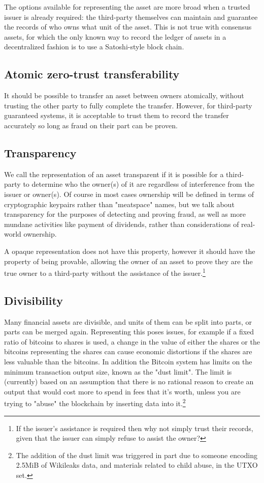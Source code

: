 \documentclass{article}
\begin{document}
The options available for representing the asset are more broad when a trusted
issuer is already required: the third-party themselves can maintain and
guarantee the records of who owns what unit of the asset. This is not true with
consensus assets, for which the only known way to record the ledger of assets
in a decentralized fashion is to use a Satoshi-style block chain.


\subsection{Atomic zero-trust transferability}

It should be possible to transfer an asset between owners atomically, without
trusting the other party to fully complete the transfer. However, for
third-party guaranteed systems, it is acceptable to trust them to record the
transfer accurately so long as fraud on their part can be proven.


\subsection{Transparency}

We call the representation of an asset transparent if it is possible for a
third-party to determine who the owner(s) of it are regardless of interference
from the issuer or owner(s). Of course in most cases ownership will be defined
in terms of cryptographic keypairs rather than "meatspace" names, but we talk
about transparency for the purposes of detecting and proving fraud, as well as
more mundane activities like payment of dividends, rather than considerations
of real-world ownership.

A opaque representation does not have this property, however it should have the
property of being provable, allowing the owner of an asset to prove they are
the true owner to a third-party without the assistance of the
issuer.\footnote{If the issuer's assistance is required then why not simply
trust their records, given that the issuer can simply refuse to assist the
owner?}


\subsection{Divisibility}

Many financial assets are divisible, and units of them can be split into parts,
or parts can be merged again. Representing this poses issues, for example if a
fixed ratio of bitcoins to shares is used, a change in the value of either the
shares or the bitcoins representing the shares can cause economic distortions
if the shares are less valuable than the bitcoins. In addition the Bitcoin
system has limits on the minimum transaction output size, known as the "dust
limit". The limit is (currently) based on an assumption that there is no
rational reason to create an output that would cost more to spend in fees that
it's worth, unless you are trying to "abuse" the blockchain by inserting data
into it.\footnote{The addition of the dust limit was triggered in part due to
someone encoding 2.5MiB of Wikileaks data, and materials related to child
abuse, in the UTXO set.}
\end{document}
